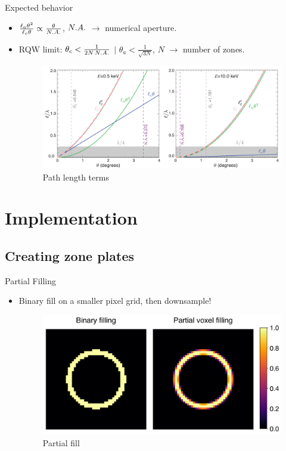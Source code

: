 \documentclass{beamer}
\def\thetaellc{\theta_c} %
\def\thetaella{\theta_a} %
\def\ellapproxc{\ell_{c}}
\def\ellapproxa{\ell_{a}}
\def\thetaellc{\theta_c} %
\def\thetaella{\theta_a} %
\def\ellapproxc{\ell_{c}}
\def\ellapproxa{\ell_{a}}
\begin{document}
\begin{frame}{Expected behavior}
	\begin{itemize}
		\item $\frac{\ellapproxa \theta^{2}}{\ellapproxc\theta} \propto\frac{\theta}{\scriptsize{N.A.}}$, $\scriptsize{N.A.}$ $\rightarrow$ numerical aperture.
		\item RQW limit\footnotemark : $\thetaellc < \frac{1}{2N\,\scriptsize{N.A.}}$ $|$ $\thetaella < \frac{1}{\sqrt{3N}}$, $N$ $\rightarrow$ number of zones.
		\begin{center}
			\begin{figure}
				\includegraphics[scale=0.35]{path_length_terms}
				\caption{Path length terms}	
			\end{figure}
		\end{center}
	\end{itemize}
\end{frame}


\section{Implementation}
\subsection{Creating zone plates}
\begin{frame}{Partial Filling}
	\begin{itemize}
		\item Binary fill on a smaller pixel grid, then downsample!
		\begin{center}
			\begin{figure}
				\includegraphics[scale=0.35]{partial_fill}
				\caption{Partial fill}	
			\end{figure}
		\end{center}
	\end{itemize}
\end{frame}
\end{document}
